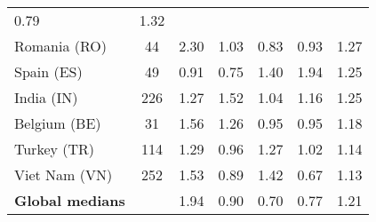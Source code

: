 \begin{table}[t]
{\begin{tabular}{lcccccc}
    \color{black} 0.79 & \color{black} 1.32 \\
    Romania (RO) & \color{black} 44 & {\cellcolor[HTML]{6AAED6}}
    \color[HTML]{F1F1F1} \color{black} 2.30 & {\cellcolor[HTML]{EAF2FB}}
    \color[HTML]{000000} \color{black} 1.03 & {\cellcolor[HTML]{F7FBFF}}
    \color[HTML]{000000} \color{black} 0.83 & {\cellcolor[HTML]{F1F7FD}}
    \color[HTML]{000000} \color{black} 0.93 & \color{black} 1.27 \\
    Spain (ES) & \color{black} 49 & {\cellcolor[HTML]{EAF2FB}} \color[HTML]{000000}
    \color{black} 0.91 & {\cellcolor[HTML]{F7FBFF}} \color[HTML]{000000}
    \color{black} 0.75 & {\cellcolor[HTML]{BFD8ED}} \color[HTML]{000000}
    \color{black} 1.40 & {\cellcolor[HTML]{6AAED6}} \color[HTML]{F1F1F1}
    \color{black} 1.94 & \color{black} 1.25 \\
    India (IN) & \color{black} 226 & {\cellcolor[HTML]{C8DCF0}}
    \color[HTML]{000000} \color{black} 1.27 & {\cellcolor[HTML]{6AAED6}}
    \color[HTML]{F1F1F1} \color{black} 1.52 & {\cellcolor[HTML]{F7FBFF}}
    \color[HTML]{000000} \color{black} 1.04 & {\cellcolor[HTML]{DFEBF7}}
    \color[HTML]{000000} \color{black} 1.16 & \color{black} 1.25 \\
    \midrule
    Belgium (BE) & \color{black} 31 & {\cellcolor[HTML]{6CAED6}}
    \color[HTML]{F1F1F1} \color{black} 1.56 & {\cellcolor[HTML]{C6DBEF}}
    \color[HTML]{000000} \color{black} 1.26 & {\cellcolor[HTML]{F7FBFF}}
    \color[HTML]{000000} \color{black} 0.95 & {\cellcolor[HTML]{F7FBFF}}
    \color[HTML]{000000} \color{black} 0.95 & \color{black} 1.18 \\
    Turkey (TR) & \color{black} 114 & {\cellcolor[HTML]{6CAED6}}
    \color[HTML]{F1F1F1} \color{black} 1.29 & {\cellcolor[HTML]{F7FBFF}}
    \color[HTML]{000000} \color{black} 0.96 & {\cellcolor[HTML]{7AB6D9}}
    \color[HTML]{000000} \color{black} 1.27 & {\cellcolor[HTML]{E3EEF9}}
    \color[HTML]{000000} \color{black} 1.02 & \color{black} 1.14 \\
    Viet Nam (VN) & \color{black} 252 & {\cellcolor[HTML]{6AAED6}}
    \color[HTML]{F1F1F1} \color{black} 1.53 & {\cellcolor[HTML]{DFEBF7}}
    \color[HTML]{000000} \color{black} 0.89 & {\cellcolor[HTML]{87BDDC}}
    \color[HTML]{000000} \color{black} 1.42 & {\cellcolor[HTML]{F7FBFF}}
    \color[HTML]{000000} \color{black} 0.67 & \color{black} 1.13 \\

    \midrule
    {\bf Global medians} & \color{black}  & {\cellcolor[HTML]{6AAED6}}
    \color[HTML]{F1F1F1} \color{black} 1.94 & {\cellcolor[HTML]{DCE9F6}}
    \color[HTML]{000000} \color{black} 0.90 & {\cellcolor[HTML]{F7FBFF}}
    \color[HTML]{000000} \color{black} 0.70 & {\cellcolor[HTML]{F7FBFF}}
    \color[HTML]{000000} \color{black} 0.77 & \color{black} 1.21 \\
    

\end{tabular}}
\end{table}
